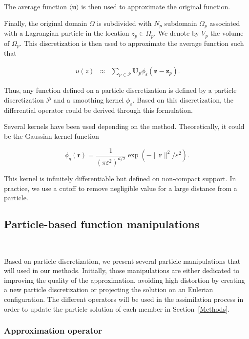 The average function $\langle \bm u \rangle$ is then used to approximate the original function.

Finally, the original domain $\Omega$ is subdivided with $N_p$ subdomain $\Omega_p$ associated with a Lagrangian particle in the location $z_p \in \Omega_p$. We denote by $V_p$ the volume of $\Omega_p$. This discretization is then used to approximate the average function such that

\begin{eqnarray}~\label{part_approx}
	u(z) &\approx& \sum_{p \in \mathcal P} \bm U_p \phi_\varepsilon (\bm z-\bm z_p).
\end{eqnarray}

Thus, any function defined on a particle discretization is defined by a particle discretization $\mathcal{P}$ and a smoothing kernel $\phi_\varepsilon$.
Based on this discretization, the differential operator could be derived through this formulation.

Several kernels have been used depending on the method. Theoretically, it could be the Gaussian kernel function

\begin{equation*}
	\phi_g(\bm r) = \frac{1}{{(\pi \varepsilon^2)}^{d/2}} \exp(-\|\bm r\|^2/\varepsilon^2).
\end{equation*}

This kernel is infinitely differentiable but defined on non-compact support. In practice, we use a cutoff to remove negligible value for a large distance from a particle.

\subsection{Particle-based function manipulations}~\label{operators}

Based on particle discretization, we present several particle manipulations that will used in our methods. Initially, those manipulations are either dedicated to improving the quality of the approximation, avoiding high distortion by creating a new particle discretization or projecting the solution on an Eulerian configuration. The different operators will be used in the assimilation process in
order to update the particle solution of each member in Section~\ref{Methods}.

\subsubsection{Approximation operator}~\label{interpOp}

